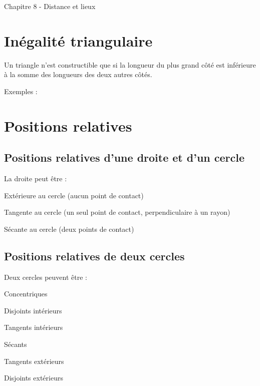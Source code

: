 \documentclass[parskip=half-, 12pt, DIV=15, twoside=semi]{scrbook}
\begin{document}
\begin{center}
    \begin{huge}
        Chapitre 8 - Distance et lieux 
    \end{huge}
\end{center}

\medbreak

\setcounter{chapter}{8}

\section{Inégalité triangulaire}
Un triangle n'est constructible que si la longueur du plus grand côté est inférieure à la somme des longueurs des deux autres côtés.

Exemples :

\vspace{2cm}

\section{Positions relatives}
\subsection{Positions relatives d'une droite et d'un cercle}

La droite peut être :
\begin{list}{\textbullet}{\itemsep=3cm}
    \item Extérieure au cercle (aucun point de contact)
    \item Tangente au cercle (un seul point de contact, perpendiculaire à un rayon)
    \item Sécante au cercle (deux points de contact)
\end{list}
\vspace{0.5cm}
\newpage

\subsection{Positions relatives de deux cercles}

Deux cercles peuvent être : 
\begin{list}{\textbullet}{\itemsep=3cm}
    \item Concentriques
    \item Disjoints intérieurs
    \item Tangents intérieurs
    \item Sécants
    \item Tangents extérieurs
    \item Disjoints extérieurs
\end{list}
\vspace{1cm}
\end{document}
